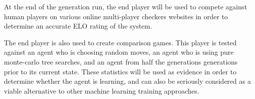 \documentclass[12pt,a4paper]{article}
\begin{document}
    At the end of the generation run, the end player will be used to compete against human players on various online multi-player checkers websites in order to determine an accurate ELO rating of the system.

    The end player is also used to create comparison games. This player is tested against an agent who is choosing random moves, an agent who is using pure monte-carlo tree searches, and an agent from half the generations generations prior to its current state. These statistics will be used as evidence in order to determine whether the agent is learning, and can also be seriously considered as a viable alternative to other machine learning training approaches.








\end{document}
